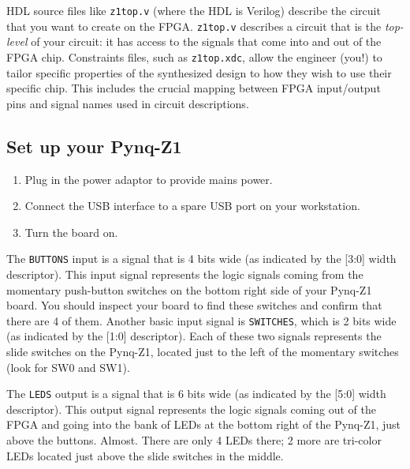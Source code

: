 \documentclass[11pt]{article}
\begin{document}


HDL source files like \verb|z1top.v| (where the HDL is Verilog) describe the circuit that you want to create on the FPGA.
\verb|z1top.v| describes a circuit that is the \emph{top-level} of your circuit: it has access to the signals that come into and out of the FPGA chip.
Constraints files, such as \verb|z1top.xdc|, allow the engineer (you!) to tailor specific properties of the synthesized design to how they wish to use their specific chip. This includes the crucial mapping between FPGA input/output pins and signal names used in circuit descriptions.

\subsection{Set up your Pynq-Z1}
\begin{enumerate}
  \item Plug in the power adaptor to provide mains power.
  \item Connect the USB interface to a spare USB port on your workstation.
  \item Turn the board on.
\end{enumerate}

The \verb|BUTTONS| input is a signal that is 4 bits wide (as indicated by the [3:0] width descriptor). This input signal represents the logic signals coming from the momentary push-button switches on the bottom right side of your Pynq-Z1 board. You should inspect your board to find these switches and confirm that there are 4 of them. Another basic input signal is \verb|SWITCHES|, which is 2 bits wide (as indicated by the [1:0] descriptor). Each of these two signals represents the slide switches on the Pynq-Z1, located just to the left of the momentary switches (look for SW0 and SW1).

The \verb|LEDS| output is a signal that is 6 bits wide (as indicated by the [5:0] width descriptor). This output signal represents the logic signals coming out of the FPGA and going into the bank of LEDs at the bottom right of the Pynq-Z1, just above the buttons. Almost. There are only 4 LEDs there; 2 more are tri-color LEDs located just above the slide switches in the middle.
\end{document}
